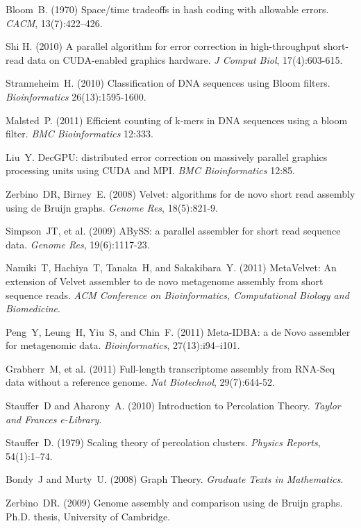 \documentclass{pnastwo}
\begin{document}
\begin{article}
\begin{thebibliography}{10}
 Bloom~B. (1970) Space/time tradeoffs in hash coding with 
allowable errors. {\it CACM}, 13(7):422--426.

 Shi H. (2010) A parallel algorithm for error correction 
in high-throughput short-read data on CUDA-enabled graphics hardware. {\it 
J Comput Biol}, 17(4):603-615.

 Stranneheim~H. (2010) Classification of DNA sequences 
using Bloom filters. {\it Bioinformatics} 26(13):1595-1600.

 Malsted~P. (2011) Efficient counting of k-mers in DNA 
sequences using a bloom filter. {\it BMC Bioinformatics} 12:333.

 Liu~Y. DecGPU: distributed error correction on 
massively parallel graphics processing units using CUDA and MPI. {\it 
BMC Bioinformatics} 12:85.

 Zerbino~DR, Birney~E. (2008) Velvet: algorithms for de novo 
short read assembly using de Bruijn graphs. {\it Genome Res}, 18(5):821-9.

 Simpson~JT, et al. (2009) ABySS: a parallel assembler for 
short read sequence data. {\it Genome Res}, 19(6):1117-23.

 Namiki~T, Hachiya~T, Tanaka~H, and Sakakibara~Y. (2011) 
MetaVelvet: An extension of Velvet assembler to de novo metagenome assembly 
from short sequence reads. {\it ACM Conference on Bioinformatics, 
Computational Biology and Biomedicine}.

 Peng~Y, Leung~H, Yiu~S, and Chin~F. (2011) Meta-IDBA: 
a de Novo assembler for metagenomic data. {\it Bioinformatics}, 
27(13):i94--i101.

 Grabherr~M, et al. (2011) Full-length transcriptome assembly 
from RNA-Seq data without a reference genome. {\it Nat Biotechnol}, 
29(7):644-52.

 Stauffer~D and Aharony~A. (2010) Introduction to 
Percolation Theory. {\it Taylor and Frances e-Library}.

 Stauffer~D. (1979) Scaling theory of 
percolation clusters. {\it Physics Reports}, 54(1):1--74.

 Bondy~J and Murty~U. (2008) Graph Theory. {\it 
Graduate Texts in Mathematics}.

 Zerbino~DR. (2009) Genome assembly and comparison 
using de Bruijn graphs. Ph.D. thesis, University of Cambridge.


\end{thebibliography}
\end{article}
\end{document}
